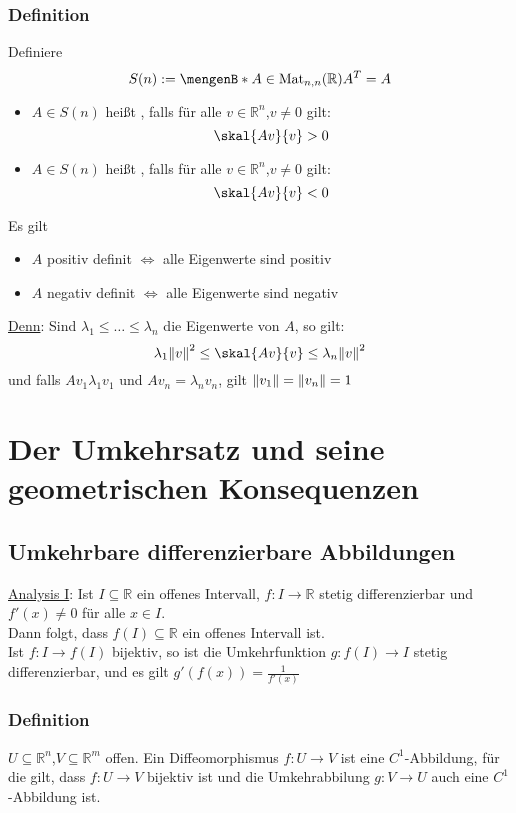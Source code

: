 \subsubsection{Definition} %
\label{ssub:definition}
Definiere 
\[
	S(n):= \set[A \in \Mat_{n,n}(\mathbb{R})]{A^T=A}
\]
\begin{itemize}
	\item $A \in S(n)$ heißt , falls für alle $v \in \mathbb{R}^n$,$v \neq 0$ gilt:
	\[
		\skal{Av}{v}>0
	\]
	\item $A \in S(n)$ heißt , falls für alle $v \in \mathbb{R}^n$,$v \neq 0$ gilt:
	\[
		\skal{Av}{v}<0
	\]
\end{itemize}
 Es gilt
\begin{itemize}
	\item $A$ positiv definit $\Leftrightarrow$ alle Eigenwerte sind positiv
	\item $A$ negativ definit $\Leftrightarrow$ alle Eigenwerte sind negativ
\end{itemize}
\underline{Denn}: Sind $\lambda_1 \leq \dots \leq \lambda_n$ die Eigenwerte von $A$, so gilt:
\[
	\lambda_1 \norm{v}^2 \leq  \skal{Av}{v} \leq \lambda_n \norm{v}^2
\]
und falls $Av_1  \lambda_1 v_1$ und $Av_n=\lambda_n v_n$, gilt $\norm{v_1}=\norm{v_n}=1$
\newpage
\section{Der Umkehrsatz und seine geometrischen Konsequenzen} %
\label{sec:der_umk}
\subsection{Umkehrbare differenzierbare Abbildungen} %
\label{sub:umkehrbare_differenzierbare_abbildungen}
\underline{Analysis I}:
Ist $I \subseteq \mathbb{R}$ ein offenes Intervall, $f: I \to \mathbb{R}$ stetig differenzierbar und $f'(x)\neq 0$ für alle $x \in I$. \\
Dann folgt, dass $f(I) \subseteq \mathbb{R}$ ein offenes Intervall ist. \\
Ist $f : I \to f(I)$ bijektiv, so ist die Umkehrfunktion $g: f(I) \to I$ stetig differenzierbar, und es gilt $g'(f(x))= \frac{1}{f'(x)}$

\subsubsection{Definition} %
\label{ssub:definition}
$ U \subseteq \mathbb{R}^n$,$V \subseteq \mathbb{R}^m$ offen. Ein Diffeomorphismus $f: U \to V$ ist eine $C^1$-Abbildung, für die gilt, dass $f:U \to V$ bijektiv ist und die Umkehrabbilung $g:V \to U$ auch eine $C^1$-Abbildung ist.
